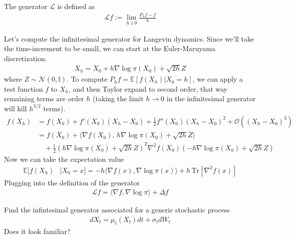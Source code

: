 \begin{definition}
	[Generator] The generator $\mathcal L$ is defined as
	\begin{align}
		\mathcal L f := \lim_{h \downarrow 0} \frac{P_h f - f}{h}
	\end{align}
\end{definition}

\begin{eg}
	Let's compute the infinitesimal generator for Langevin dynamics. Since we'll take the time-increment to be small, we can start at the Euler-Maruyama discretization.
	\begin{align}
		X_h = X_0 + h \nabla \log \pi(X_0) + \sqrt{2 h} Z
	\end{align} 
	where $Z \sim \mathcal N(0, \mathbb I)$. To compute $P_h f = \mathbb E[f(X_h) | X_0 = h]$, we can apply a test function $f$ to $X_h$, and then Taylor expand to second order, that way remaining terms are order $h$ (taking the limit $h \to 0$ in the infinitesimal generator will kill $h^{3/2}$ terms).
	\begin{align}
	f(X_h) & = f(X_0) + f'(X_0) (X_h-X_0) + \frac 1 2 f''(X_0)(X_h-X_0)^2 + \mathcal O((X_h-X_0)^3)\\
	& = f(X_0) + \langle \nabla f(X_0) ,  \, h \nabla \log \pi(X_0)  + \sqrt{2h} Z\rangle \nonumber \\
	& \quad + \frac{1}{2} (h \nabla \log \pi(X_0)  + \sqrt{2h} Z)^T \nabla^2 f(X_0) (-h \nabla \log \pi(X_0)  + \sqrt{2h} Z)  
\end{align}
Now we can take the expectation value
\begin{align}
	\mathbb E[f(X_h) & | X_0=x] = -h \langle \nabla f(x) , \nabla \log \pi(x) \rangle +  h \, \text{Tr}[\nabla^2 f(x)]
\end{align}
Plugging into the definition of the generator
\begin{align}
	\mathcal L f =  \langle \nabla f , \nabla \log \pi \rangle + \Delta f
\end{align}
\end{eg}
\begin{problem}
	Find the infintesimal generator associated for a generic stochastic process
	\begin{align}
		dX_t= \mu_t(X_t) dt + \sigma_t dW_t
	\end{align}
	Does it look familiar?
\end{problem}

